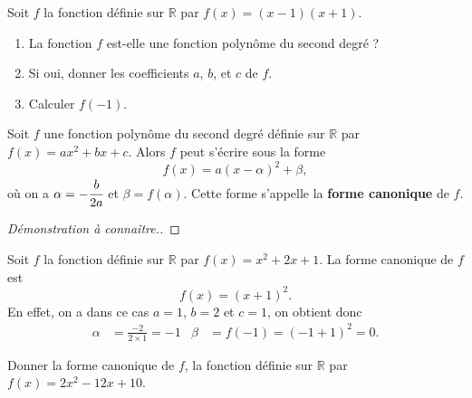 \documentclass[11pt]{article}
\begin{document}
\begin{app}
  Soit $f$ la fonction définie sur $\mathbb{R}$ par $f(x) = (x-1)(x+1)$.
  \begin{enumerate}
    \item La fonction $f$ est-elle une fonction polynôme du second degré ?
    \item Si oui, donner les coefficients $a$, $b$, et $c$ de $f$.
    \item Calculer $f(-1)$.
  \end{enumerate}
\end{app}

\begin{prop}
  Soit $f$ une fonction polynôme du second degré définie sur $\mathbb{R}$ par
  \(
    f(x) = ax^2+bx+c.
  \)
  Alors $f$ peut s'écrire sous la forme
  \[
    f(x) = a(x-\alpha)^2+\beta,
  \]
  où on a $\alpha=-\cfrac{b}{2a}$ et $\beta=f(\alpha)$. Cette forme s'appelle la
  \textbf{forme canonique} de $f$.
\end{prop}

\begin{proof}[Démonstration à connaître.]
\end{proof}

\begin{exemple}
  Soit $f$ la fonction définie sur $\mathbb{R}$ par $f(x) = x^2 + 2x + 1$.
  La forme canonique de $f$ est 
  \[
    f(x) = (x+1)^2.
  \]
  En effet, on a dans ce cas $a=1$, $b=2$ et $c=1$, on obtient donc
  \begin{align*}
    \alpha &= \frac{-2}{2\times1} = -1 &
    \beta &= f(-1) = (-1+1)^2 = 0.
  \end{align*}
\end{exemple}

\begin{app}
  Donner la forme canonique de $f$, la fonction définie sur $\mathbb{R}$ par
  $f(x) = 2x^2-12x+10$.
\end{app}
\end{document}
